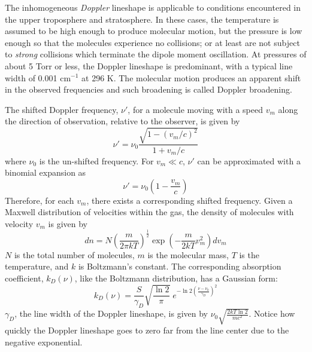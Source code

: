\documentclass[11pt]{article}
\begin{document}
The inhomogeneous {\it Doppler} lineshape is applicable to conditions 
encountered in 
the upper troposphere and stratosphere.  In these cases, the temperature is 
assumed to be high enough to produce molecular motion, but the pressure is 
low enough so that the molecules experience no collisions; or at least are 
not subject to {\it strong} collisions which terminate the dipole moment 
oscillation.
At pressures of about 5 Torr or less, the Doppler lineshape 
is predominant, with a typical line width of 0.001 cm$^{-1}$ at 296 K. 
The molecular motion produces an apparent shift in the observed frequencies
and such broadening is called Doppler broadening.

The shifted Doppler frequency, $\nu '$, for a molecule moving with a
speed $v_{m}$ along the direction of observation, relative to the observer,
is given by
\begin{equation}
 \nu '=\nu_{0}\frac{\sqrt{1-(v_{m}/c)^{2}}}{1+v_{m}/c}
\end{equation}
where $\nu_{0}$ is the un-shifted frequency. For $v_{m} \ll c$, $\nu '$
can be approximated with a binomial expansion as
\begin{equation}
 \nu '=\nu_{0}\left(1-\frac{v_{m}}{c}\right)
\end{equation}
Therefore, for each $v_{m}$, there exists a corresponding shifted frequency.
Given a Maxwell distribution of velocities within the gas, the density of
molecules with velocity $v_{m}$ is given by
\begin{equation}
 dn=N\left(\frac{m}{2\pi kT}\right)^{\frac{1}{2}}\exp\left(-\frac{m}{2kT}
v_{m}^{2}\right)dv_{m}
\end{equation}
$N$ is the total number of molecules, $m$ is the molecular mass, $T$ is the
temperature, and $k$ is Boltzmann's constant.  The corresponding absorption
coefficient, $k_{D}(\nu)$, like the Boltzmann distribution, has a
Gaussian form:
\begin{equation}
 k_{D}(\nu)=\frac{S}{\gamma_{D}}\sqrt{\frac{\ln 2}{\pi}} \; e^{-\ln 2
  \left(\frac{\nu -\nu_{0}}{\gamma_{D}}\right)^{2}}
\end{equation}
$\gamma_{D}$, the line width of the Doppler lineshape, is given by
$\nu_{0}\sqrt{\frac{2kT \ln 2}{mc^{2}}}$.    Notice how quickly the
Doppler lineshape goes to zero far from the line center due to the negative
exponential.  
\end{document}
